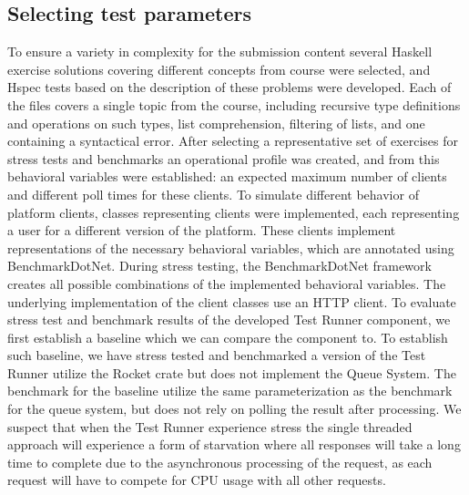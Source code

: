\subsection{Selecting test parameters}
To ensure a variety in complexity for the submission content several Haskell exercise solutions covering different concepts from course were selected, and Hspec tests based on the description of these problems were developed.  
Each of the files covers a single topic from the course, including recursive type definitions and operations on such types, list comprehension, filtering of lists, and one containing a syntactical error.
After selecting a representative set of exercises for stress tests and benchmarks an operational profile was created, and from this behavioral variables were established: an expected maximum number of clients and different poll times for these clients.
To simulate different behavior of platform clients, classes representing clients were implemented, each representing a user for a different version of the platform.
These clients implement representations of the necessary behavioral variables, which are annotated using BenchmarkDotNet.
During stress testing, the BenchmarkDotNet framework creates all possible combinations of the implemented behavioral variables.
The underlying implementation of the client classes use an HTTP client.
To evaluate stress test and benchmark results of the developed Test Runner component, we first establish a baseline which we can compare the component to. To establish such baseline, we have stress tested and benchmarked a version of the Test Runner utilize the Rocket crate but does not implement the Queue System. 
The benchmark for the baseline utilize the same parameterization as the benchmark for the queue system, but does not rely on polling the result after processing. 
We suspect that when the Test Runner experience stress the single threaded approach will experience a form of starvation where all responses will take a long time to complete due to the asynchronous processing of the request, as each request will have to compete for CPU usage with all other requests.

